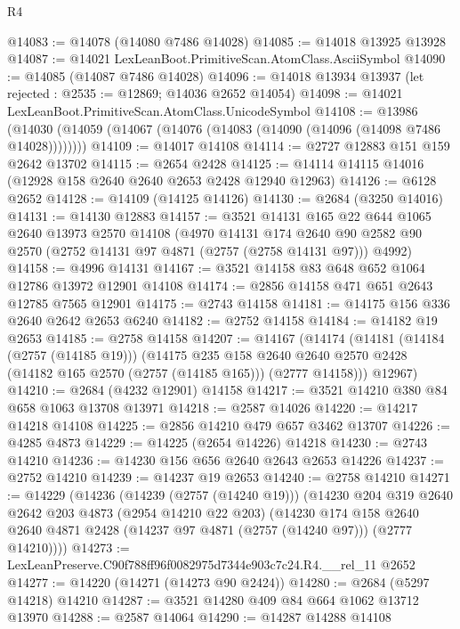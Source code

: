 \begin{lexlean}{R4}
\begin{coremodule}
@14083 := @14078 (@14080 @7486 @14028)
@14085 := @14018 @13925 @13928
@14087 := @14021 LexLeanBoot.PrimitiveScan.AtomClass.AsciiSymbol
@14090 := @14085 (@14087 @7486 @14028)
@14096 := @14018 @13934 @13937 (let rejected : @2535 := @12869; @14036 @2652 @14054)
@14098 := @14021 LexLeanBoot.PrimitiveScan.AtomClass.UnicodeSymbol
@14108 := @13986
    (@14030 (@14059 (@14067 (@14076 (@14083 (@14090 (@14096 (@14098 @7486 @14028))))))))
@14109 := @14017 @14108
@14114 := @2727 @12883 @151 @159 @2642 @13702
@14115 := @2654 @2428
@14125 := @14114 @14115 @14016 (@12928 @158 @2640 @2640 @2653 @2428 @12940 @12963)
@14126 := @6128 @2652
@14128 := @14109 (@14125 @14126)
@14130 := @2684 (@3250 @14016)
@14131 := @14130 @12883
@14157 := @3521
    @14131
    @165
    @22
    @644
    @1065
    @2640
    @13973
    @2570
    @14108
    (@4970
      @14131
      @174
      @2640
      @90
      @2582
      @90
      @2570
      (@2752 @14131 @97 @4871 (@2757 (@2758 @14131 @97)))
      @4992)
@14158 := @4996 @14131
@14167 := @3521 @14158 @83 @648 @652 @1064 @12786 @13972 @12901 @14108
@14174 := @2856 @14158 @471 @651 @2643 @12785 @7565 @12901
@14175 := @2743 @14158
@14181 := @14175 @156 @336 @2640 @2642 @2653 @6240
@14182 := @2752 @14158
@14184 := @14182 @19 @2653
@14185 := @2758 @14158
@14207 := @14167
    (@14174
      (@14181
        (@14184 (@2757 (@14185 @19)))
        (@14175
          @235
          @158
          @2640
          @2640
          @2570
          @2428
          (@14182 @165 @2570 (@2757 (@14185 @165)))
          (@2777 @14158)))
      @12967)
@14210 := @2684 (@4232 @12901) @14158
@14217 := @3521 @14210 @380 @84 @658 @1063 @13708 @13971
@14218 := @2587 @14026
@14220 := @14217 @14218 @14108
@14225 := @2856 @14210 @479 @657 @3462 @13707
@14226 := @4285 @4873
@14229 := @14225 (@2654 @14226) @14218
@14230 := @2743 @14210
@14236 := @14230 @156 @656 @2640 @2643 @2653 @14226
@14237 := @2752 @14210
@14239 := @14237 @19 @2653
@14240 := @2758 @14210
@14271 := @14229
    (@14236
      (@14239 (@2757 (@14240 @19)))
      (@14230
        @204
        @319
        @2640
        @2642
        @203
        @4873
        (@2954 @14210 @22 @203)
        (@14230
          @174
          @158
          @2640
          @2640
          @4871
          @2428
          (@14237 @97 @4871 (@2757 (@14240 @97)))
          (@2777 @14210))))
@14273 := LexLeanPreserve.C90f788ff96f0082975d7344e903c7c24.R4.__rel_11 @2652
@14277 := @14220 (@14271 (@14273 @90 @2424))
@14280 := @2684 (@5297 @14218) @14210
@14287 := @3521 @14280 @409 @84 @664 @1062 @13712 @13970
@14288 := @2587 @14064
@14290 := @14287 @14288 @14108

\end{coremodule}
\end{lexlean}
